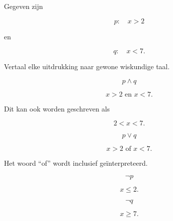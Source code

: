 \documentclass{ximera}
\begin{document}
\begin{oefening}{\oefB \ESS}

Gegeven zijn

\[
p:\quad x>2
\]

en

\[
q:\quad x<7.
\]

Vertaal elke uitdrukking naar gewone wiskundige taal.

\begin{question}

\[
p\land q
\]

\begin{oplossing}

\[
x>2\text{ en }x<7.
\]

Dit kan ook worden geschreven als

\[
2<x<7.
\]

\end{oplossing}

\end{question}



\begin{question}

\[
p\lor q
\]

\begin{oplossing}

\[
x>2\text{ of }x<7.
\]

Het woord ``of'' wordt inclusief geïnterpreteerd.

\end{oplossing}

\end{question}



\begin{question}

\[
\neg p
\]

\begin{oplossing}

\[
x\leq2.
\]

\end{oplossing}

\end{question}



\begin{question}

\[
\neg q
\]

\begin{oplossing}

\[
x\geq7.
\]

\end{oplossing}

\end{question}

\end{oefening}
\end{document}
